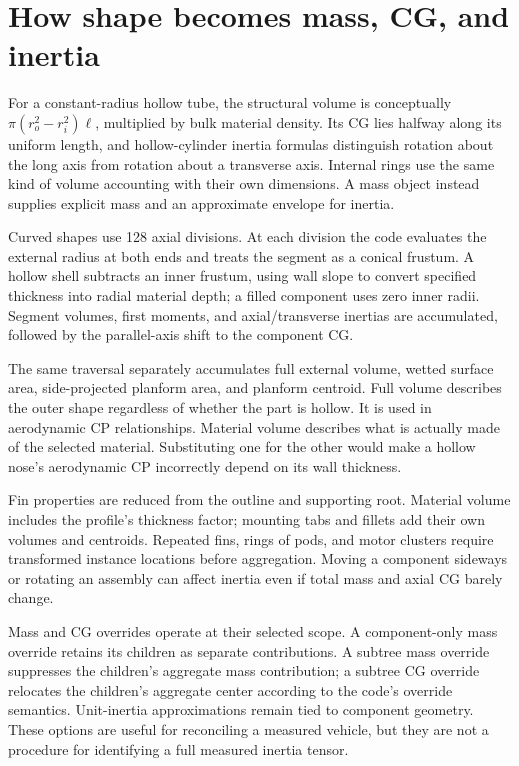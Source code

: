 \section{How shape becomes mass, CG, and inertia}
For a constant-radius hollow tube, the structural volume is conceptually $\pi(r_o^2-r_i^2)\ell$, multiplied by bulk material density. Its CG lies halfway along its uniform length, and hollow-cylinder inertia formulas distinguish rotation about the long axis from rotation about a transverse axis. Internal rings use the same kind of volume accounting with their own dimensions. A mass object instead supplies explicit mass and an approximate envelope for inertia.

Curved  shapes use 128 axial divisions. At each division the code evaluates the external radius at both ends and treats the segment as a conical frustum. A hollow shell subtracts an inner frustum, using wall slope to convert specified thickness into radial material depth; a filled component uses zero inner radii. Segment volumes, first moments, and axial/transverse inertias are accumulated, followed by the parallel-axis shift to the component CG.

The same traversal separately accumulates full external volume, wetted surface area, side-projected planform area, and planform centroid. Full volume describes the outer shape regardless of whether the part is hollow. It is used in aerodynamic CP relationships. Material volume describes what is actually made of the selected material. Substituting one for the other would make a hollow nose's aerodynamic CP incorrectly depend on its wall thickness.

Fin properties are reduced from the outline and supporting root. Material volume includes the profile's thickness factor; mounting tabs and fillets add their own volumes and centroids. Repeated fins, rings of pods, and motor clusters require transformed instance locations before aggregation. Moving a component sideways or rotating an assembly can affect inertia even if total mass and axial CG barely change.

Mass and CG overrides operate at their selected scope. A component-only mass override retains its children as separate contributions. A subtree mass override suppresses the children's aggregate mass contribution; a subtree CG override relocates the children's aggregate center according to the code's override semantics. Unit-inertia approximations remain tied to component geometry. These options are useful for reconciling a measured vehicle, but they are not a procedure for identifying a full measured inertia tensor.

